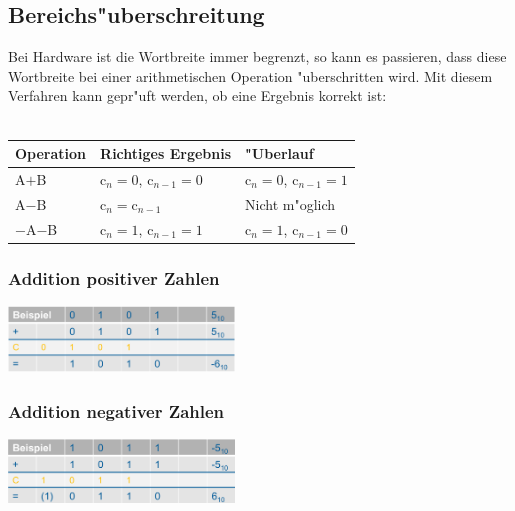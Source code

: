 \subsection{Bereichs"uberschreitung}
	Bei Hardware ist die Wortbreite immer begrenzt, so kann es passieren, dass diese Wortbreite bei einer arithmetischen Operation "uberschritten wird.
	Mit diesem Verfahren kann gepr"uft werden, ob eine Ergebnis korrekt ist:\\
	\ \newline
	\begin{tabular}{|l|l|l|}
		\hline
			Operation & Richtiges Ergebnis & "Uberlauf \\
		\hline
		\hline
			A$+$B & c$_n=0$, c$_{n-1}=0$ & c$_n=0$, c$_{n-1}=1$ \\
			A$-$B & c$_n=$c$_{n-1}$ & Nicht m"oglich \\
			$-$A$-$B & c$_n=1$, c$_{n-1}=1$ & c$_n=1$, c$_{n-1}=0$ \\
		\hline		
	\end{tabular}

	\begin{multicols}{2}
		\subsubsection{Addition positiver Zahlen}
		\includegraphics[width=0.45\textwidth]{pics/zahlensysteme/addition_posZahlen.png}
		
		\subsubsection{Addition negativer Zahlen}
		\includegraphics[width=0.45\textwidth]{pics/zahlensysteme/addition_negZahlen.png}
	\end{multicols}
